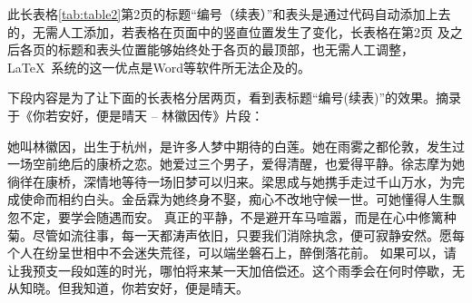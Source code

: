 此长表格\ref{tab:table2}第2页的标题“编号（续表）”和表头是通过代码自动添加上去的，无需人工添加，若表格在页面中的竖直位置发生了变化，长表格在第2页
及之后各页的标题和表头位置能够始终处于各页的最顶部，也无需人工调整，\LaTeX~系统的这一优点是Word等软件所无法企及的。

下段内容是为了让下面的长表格分居两页，看到表标题“编号(续表)”的效果。摘录于《你若安好，便是晴天 -- 林徽因传》片段：

她叫林徽因，出生于杭州，是许多人梦中期待的白莲。她在雨雾之都伦敦，发生过一场空前绝后的康桥之恋。她爱过三个男子，爱得清醒，也爱得平静。徐志摩为她徜徉在康桥，深情地等待一场旧梦可以归来。梁思成与她携手走过千山万水，为完成使命而相约白头。金岳霖为她终身不娶，痴心不改地守候一世。可她懂得人生飘忽不定，要学会随遇而安。
真正的平静，不是避开车马喧嚣，而是在心中修篱种菊。尽管如流往事，每一天都涛声依旧，只要我们消除执念，便可寂静安然。愿每个人在纷呈世相中不会迷失荒径，可以端坐磐石上，醉倒落花前。
如果可以，请让我预支一段如莲的时光，哪怕将来某一天加倍偿还。这个雨季会在何时停歇，无从知晓。但我知道，你若安好，便是晴天。

